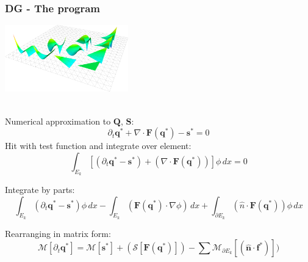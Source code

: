 \documentclass{beamer}
\begin{document}
\begin{frame}\frametitle{DG - The program}
  \begin{multicols}{2}
    \includegraphics[width=0.4\textwidth]{figures/pkdo-2d.png}
    \vspace{-10pt}
   
    \vspace{-10pt}
    \columnbreak \\
    Numerical approximation to $\mathbf{Q}$, $\mathbf{S}$:
    \begin{equation*}
      \partial_t\mathbf{q}^{*} + \nabla \cdot \mathbf{F}(\mathbf{q}^{*}) - \mathbf{s}^{*} = 0
    \end{equation*}
    Hit with test function and integrate over element:
    \begin{equation*}
      \int_{E_k}[(\partial_t\mathbf{q}^{*} - \mathbf{s}^{*}) + (\nabla \cdot \mathbf{F}(\mathbf{q}^{*}))]\phi\,dx = 0
    \end{equation*}
  \end{multicols}
  \begin{center}
    Integrate by parts:
    \begin{equation*}
      \int_{E_k}(\partial_t\mathbf{q}^{*}- \mathbf{s}^{*})\phi\,dx -
      \int_{E_k}(\mathbf{F}(\mathbf{q}^{*}) \cdot \nabla{\phi})\,dx +
      \int_{\partial{E_k}}(\hat{n} \cdot \mathbf{F}(\mathbf{q}^{*}))\phi\,dx
    \end{equation*}
  \end{center}
  \begin{center}
    Rearranging in matrix form:
    \begin{equation*}
      \mathcal{M}[\partial_t\mathbf{q}^{*}] = \mathcal{M}[\mathbf{s}^{*}] + ( \mathcal{S}[\mathbf{F}(\mathbf{q}^{*})] )
      - \sum{\mathcal{M}_{\partial{E_k}}[(\hat{\mathbf{n}} \cdot \mathbf{f}^{*})]} ) 
    \end{equation*}
  \end{center}
\end{frame}
\end{document}
